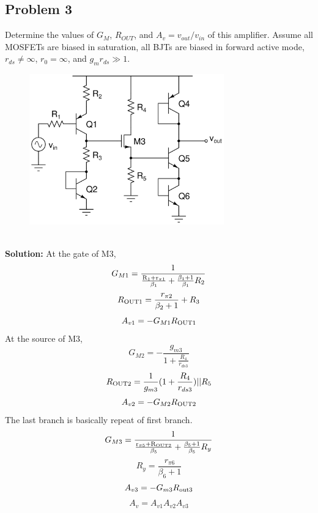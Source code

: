 \documentclass{article}
\begin{document}
\subsection*{Problem 3}
Determine the values of $G_M$, $R_{OUT}$, and $A_v = v_{out}/v_{in}$ of this amplifier.  Assume all MOSFETs are biased in saturation, all BJTs are biased in forward active mode, $r_{ds} \ne \infty$, $r_0 = \infty$, and $g_mr_{ds} \gg 1$.
\begin{figure}[!h]
\begin{center}
    \includegraphics[width=0.75\textwidth]{figures/cc_amp_3.png}
\end{center}
\end{figure} \\
\textbf{Solution:}
At the gate of M3,
$$G_{M1} = \frac{1}{\frac{\rm R_{1} + r_{\pi 1}}{\beta_1} + \frac{\beta_1 + 1}{\beta_1} R_2} $$
$$R_{\rm OUT1} = \frac{r_{\pi 2}}{\beta_2 + 1} + R_3$$
$$A_{v1} = -G_{M1}R_{\rm OUT1}$$
At the source of M3,
$$G_{M2} = -\frac{g_{m3}}{1+\frac{R_4}{r_{ds3}}}$$
$$R_{\rm OUT2} = \frac{1}{g_{m3}} (1 + \frac{R_4}{r_{ds3}}) || R_5$$
$$A_{v2} = -G_{M2}R_{\rm OUT2}$$
The last branch is basically repeat of first branch.
$$G_{M3} = \frac{1}{\frac{\rm  r_{\pi 5} + R_{OUT2}}{\beta_5} + \frac{\beta_5 + 1}{\beta_5} R_y}$$
$$R_y = \frac{r_{\pi 6}}{\beta_6 + 1}$$
$$A_{v3} = -G_{m3}R_{\rm out3}$$
$$A_{v} = A_{v1}A_{v2}A_{v3}$$
\newpage
\end{document}
